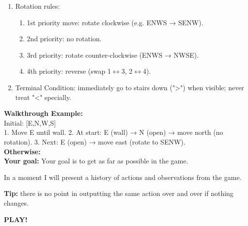 \begin{MyGreenBox}
{\begin{enumerate}
\begin{itemize}
\begin{itemize}
	\item Wall collision: mark permanent\_walls, skip direction, continue.\end{itemize}\end{itemize}

	\item Rotation rules: \begin{enumerate}\item 1st priority move: rotate clockwise (e.g. ENWS → SENW).

	\item 2nd priority: no rotation.

	\item 3rd priority: rotate counter-clockwise (ENWS → NWSE).

	\item 4th priority: reverse (swap 1$\leftrightarrow$3, 2$\leftrightarrow$4).\end{enumerate}

	\item Terminal Condition: immediately go to stairs down (">") when visible; never treat "<" specially.\end{enumerate}

	\textbf{Walkthrough Example:}\\ Initial: [E,N,W,S]\\ 1. Move E until wall. 2. At start: E (wall) → N (open) → move north (no rotation). 3. Next: E (open) → move east (rotate to SENW).\\


	\textbf{Otherwise:}\\ \textbf{Your goal:} Your goal is to get as far as possible in the game.

	In a moment I will present a history of actions and observations from the game.

	\textbf{Tip:} there is no point in outputting the same action over and over if nothing changes.

	\textbf{PLAY!} }
\end{MyGreenBox}